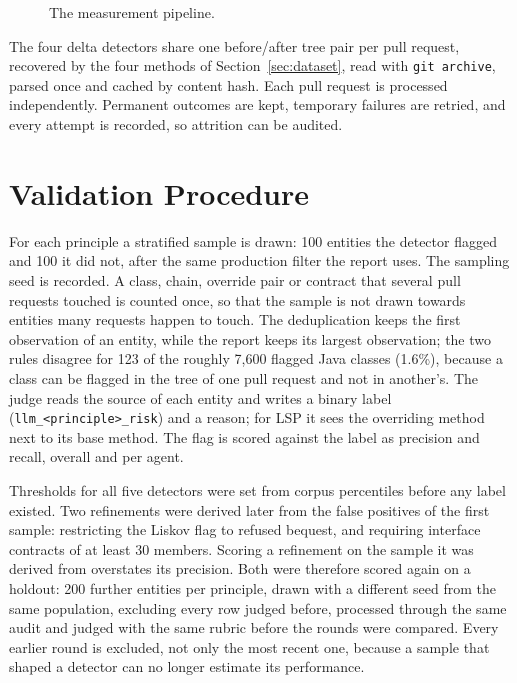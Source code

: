 \begin{figure}[htb]
\centering

\caption{The measurement pipeline.}
\label{fig:pipeline}
\end{figure}

The four delta detectors share one before/after tree pair per pull request, recovered by the four
methods of Section~\ref{sec:dataset}, read with \texttt{git archive}, parsed once and cached by
content hash. Each pull request is processed independently. Permanent outcomes are kept, temporary
failures are retried, and every attempt is recorded, so attrition can be audited.

\section{Validation Procedure}
\label{sec:validation}

For each principle a stratified sample is drawn: 100 entities the detector flagged and 100 it did
not, after the same production filter the report uses. The sampling seed is recorded. A class,
chain, override pair or contract that several pull requests touched is counted once, so that the
sample is not drawn towards entities many requests happen to touch. The deduplication keeps the
first observation of an entity, while the report keeps its largest observation; the two rules
disagree for 123 of the roughly 7{,}600 flagged Java classes (1.6\%), because a class can be flagged
in the tree of one pull request and not in another's. The judge reads
the source of each entity and writes a binary label (\texttt{llm\_<principle>\_risk}) and a reason;
for LSP it sees the overriding method next to its base method. The flag is scored against the label
as precision and recall, overall and per agent.

Thresholds for all five detectors were set from corpus percentiles before any label existed. Two
refinements were derived later from the false positives of the first sample: restricting the Liskov
flag to refused bequest, and requiring interface contracts of at least 30 members. Scoring a
refinement on the sample it was derived from overstates its precision. Both were therefore scored
again on a holdout: 200 further entities per principle, drawn with a different seed from the same
population, excluding every row judged before, processed through the same audit and judged with the
same rubric before the rounds were compared. Every earlier round is excluded, not only the most
recent one, because a sample that shaped a detector can no longer estimate its performance.

